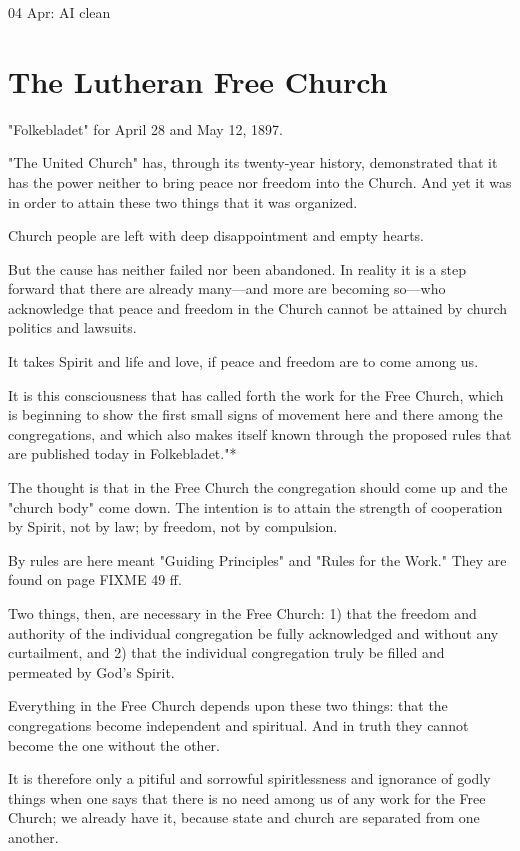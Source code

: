 04 Apr: AI clean

\section{The Lutheran Free Church}

"Folkebladet" for April 28 and May 12, 1897.

"The United Church" has, through its twenty-year history, demonstrated that it has the power neither to bring peace nor freedom into the Church. And yet it was in order to attain these two things that it was organized.

Church people are left with deep disappointment and empty hearts.

But the cause has neither failed nor been abandoned. In reality it is a step forward that there are already many---and more are becoming so---who acknowledge that peace and freedom in the Church cannot be attained by church politics and lawsuits.

It takes Spirit and life and love, if peace and freedom are to come among us.

It is this consciousness that has called forth the work for the Free Church, which is beginning to show the first small signs of movement here and there among the congregations, and which also makes itself known through the proposed rules that are published today in Folkebladet."*

The thought is that in the Free Church the congregation should come up and the "church body" come down. The intention is to attain the strength of cooperation by Spirit, not by law; by freedom, not by compulsion.

By rules are here meant "Guiding Principles" and "Rules for the Work." They are found on page {FIXME 49 ff}.

Two things, then, are necessary in the Free Church: 1) that the freedom and authority of the individual congregation be fully acknowledged and without any curtailment, and 2) that the individual congregation truly be filled and permeated by God’s Spirit.

Everything in the Free Church depends upon these two things: that the congregations become independent and spiritual. And in truth they cannot become the one without the other.

It is therefore only a pitiful and sorrowful spiritlessness and ignorance of godly things when one says that there is no need among us of any work for the Free Church; we already have it, because state and church are separated from one another.

